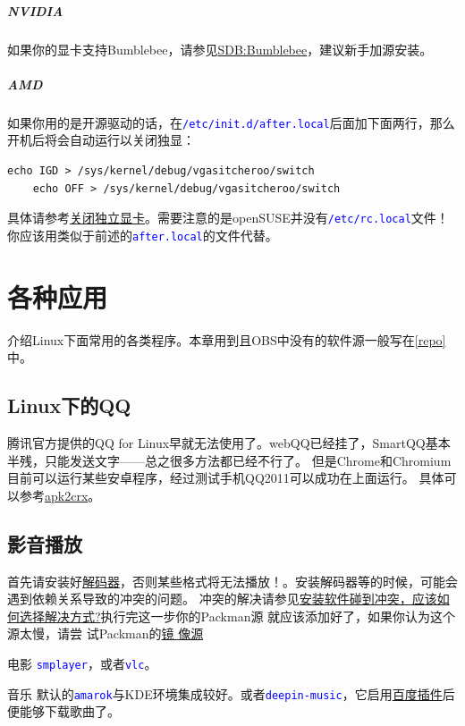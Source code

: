\documentclass[12pt,openany]{book}
\newcommand{\command}[1]{\texttt{\textcolor{blue}{#1}}}
\newcommand{\soft}[1]{\texttt{\textcolor{blue}{#1}}}
\begin{document}
\paragraph{NVIDIA} 如果你的显卡支持Bumblebee，请参见\href{https://zh.opensuse.org/SDB:Bumblebee}{SDB:Bumblebee}，建议新手加源安装。

\paragraph{AMD} 如果你用的是开源驱动的话，在\command{/etc/init.d/after.local}后面加下面两行，那么开机后将会自动运行以关闭独显：
\begin{Verbatim}[formatcom=\color{codecolor}]
    echo IGD > /sys/kernel/debug/vgasitcheroo/switch
    echo OFF > /sys/kernel/debug/vgasitcheroo/switch    
\end{Verbatim}
具体请参考\href{https://linuxtoy.org/archives/how-to-use-vga-switcheroo-disable-video-card-linux-kms.html}{关闭独立显卡}。需要注意的是openSUSE并没有\command{/etc/rc.local}文件！你应该用类似于前述的\command{after.local}的文件代替。
\chapter{各种应用}
介绍Linux下面常用的各类程序。本章用到且OBS中没有的软件源一般写在\ref{repo}中。
\section{Linux下的QQ}
腾讯官方提供的QQ for Linux早就无法使用了。webQQ已经挂了，SmartQQ基本半残，只能发送文字——总之很多方法都已经不行了。
但是Chrome和Chromium目前可以运行某些安卓程序，经过测试手机QQ2011可以成功在上面运行。
具体可以参考\href{http://huodong.ustc.edu.cn/Crx}{apk2crx}。
\section{影音播放}
{\color{orange}首先请安装好\href{https://lug.ustc.edu.cn/sites/opensuse-guide/codecs.php}{解码器}，否则某些格式将无法播放！}。安装解码器等的时候，可能会遇到依赖关系导致的冲突的问题。
冲突的解决请参见\href{https://forum.suse.org.cn/viewtopic.php?t=2867&p=22491#p22491}{安装软件碰到冲突，应该如何选择解决方式?}执行完这一步你的Packman源
就应该添加好了，如果你认为这个源太慢，请尝
试Packman的\href{http://packman.links2linux.org/mirrors}{镜%
像源}
\begin{compactdesc}
 \item[电影] \soft{smplayer}，或者\soft{vlc}。
 \item[音乐] 默认的\soft{amarok}与KDE环境集成较好。或者\soft{deepin-music}，它启用\href{https://forum.suse.org.cn/viewtopic.php?f=7&t=2530}{百度插件}后便能够下载歌曲了。
\end{compactdesc}
\end{document}
